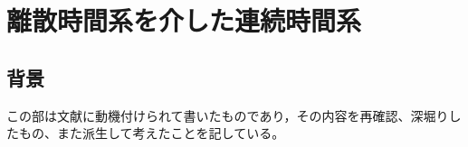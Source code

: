 \part{離散時間系を介した連続時間系}
    \chapter{背景}
        この部は文献\cite{digital-servo}に動機付けられて書いたものであり，その内容を再確認、深堀りしたもの、また派生して考えたことを記している。
    
    
